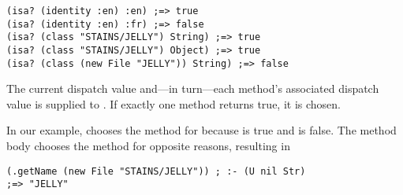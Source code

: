 \begin{verbatim}
(isa? (identity :en) :en) ;=> true
(isa? (identity :en) :fr) ;=> false
(isa? (class "STAINS/JELLY") String) ;=> true
(isa? (class "STAINS/JELLY") Object) ;=> true
(isa? (class (new File "JELLY")) String) ;=> false
\end{verbatim}
%
The current dispatch value and---in turn---each method's associated dispatch value
is supplied to . If exactly one method returns true, it is chosen.

In our example,
chooses the  method for  because
is true and
is false. The  method body
chooses the  method for opposite reasons,
resulting in 
\begin{verbatim}
(.getName (new File "STAINS/JELLY")) ; :- (U nil Str)
;=> "JELLY"
\end{verbatim}

%
%
%

